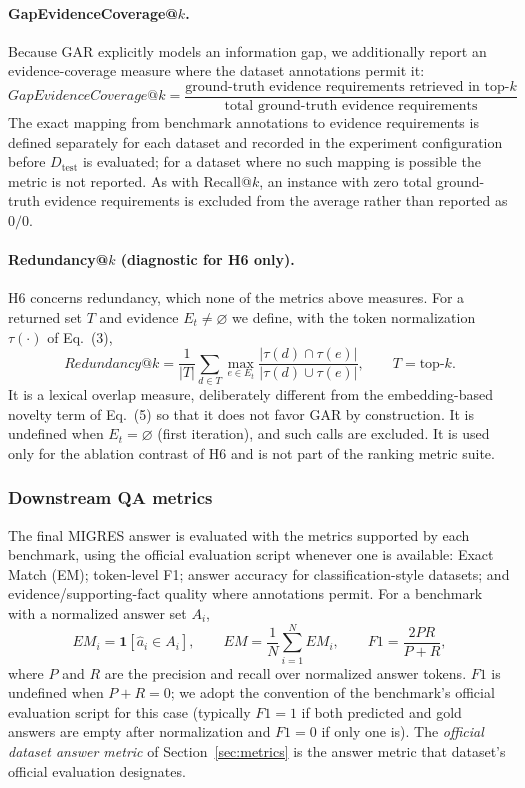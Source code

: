\documentclass[11pt,a4paper]{article}
\begin{document}
\paragraph{GapEvidenceCoverage@$k$.} Because GAR explicitly models an information gap, we additionally report an evidence-coverage measure where the dataset annotations permit it:
\[
\boxed{
GapEvidenceCoverage@k
=
\frac{
\text{ground-truth evidence requirements retrieved in top-}k
}{
\text{total ground-truth evidence requirements}
}
}
\]
The exact mapping from benchmark annotations to evidence requirements is defined separately for each dataset and recorded in the experiment configuration before $D_{\mathrm{test}}$ is evaluated; for a dataset where no such mapping is possible the metric is not reported. As with Recall@$k$, an instance with zero total ground-truth evidence requirements is excluded from the average rather than reported as $0/0$.

\paragraph{Redundancy@$k$ (diagnostic for H6 only).} H6 concerns redundancy, which none of the metrics above measures. For a returned set $T$ and evidence $E_t\neq\varnothing$ we define, with the token normalization $\tau(\cdot)$ of Eq.~(3),
\[
Redundancy@k
=
\frac{1}{|T|}\sum_{d\in T}\max_{e\in E_t}
\frac{|\tau(d)\cap\tau(e)|}{|\tau(d)\cup\tau(e)|},
\qquad T=\text{top-}k.
\]
It is a lexical overlap measure, deliberately different from the embedding-based novelty term of Eq.~(5) so that it does not favor GAR by construction. It is undefined when $E_t=\varnothing$ (first iteration), and such calls are excluded. It is used only for the ablation contrast of H6 and is not part of the ranking metric suite.

\subsubsection{Downstream QA metrics}
\label{sec:downstream}

The final MIGRES answer is evaluated with the metrics supported by each benchmark, using the official evaluation script whenever one is available: Exact Match (EM); token-level F1; answer accuracy for classification-style datasets; and evidence/supporting-fact quality where annotations permit. For a benchmark with a normalized answer set $A_i$,
\[
EM_i=\mathbf{1}[\hat a_i\in A_i],
\qquad
EM=\frac{1}{N}\sum_{i=1}^{N}EM_i,
\qquad
F1=\frac{2PR}{P+R},
\]
where $P$ and $R$ are the precision and recall over normalized answer tokens. $F1$ is undefined when $P+R=0$; we adopt the convention of the benchmark's official evaluation script for this case (typically $F1=1$ if both predicted and gold answers are empty after normalization and $F1=0$ if only one is). The \emph{official dataset answer metric} of Section~\ref{sec:metrics} is the answer metric that dataset's official evaluation designates.
\end{document}
